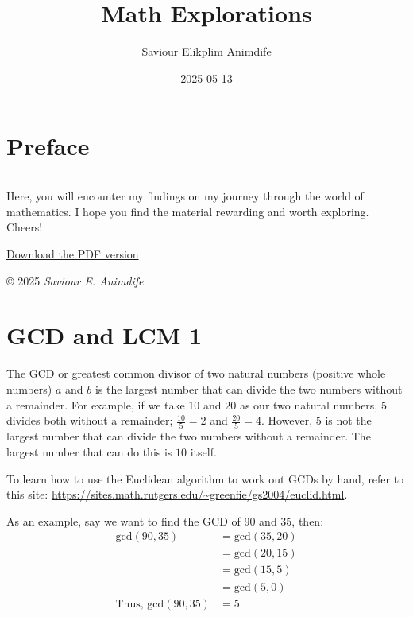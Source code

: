 \documentclass[
]{book}
\title{Math Explorations}
\author{Saviour Elikplim Animdife}
\date{2025-05-13}
\begin{document}
\maketitle

{
\setcounter{tocdepth}{1}
\tableofcontents
}
\chapter*{Preface}\label{preface}

\begin{center}\rule{0.5\linewidth}{0.5pt}\end{center}

Here, you will encounter my findings on my journey through the world of mathematics. I hope you find the material rewarding and worth exploring. Cheers!

\href{https://github.com/sneurocode/math-explorations/blob/master/docs/_main.pdf}{Download the PDF version}

© 2025 \emph{Saviour E. Animdife}

\chapter{GCD and LCM 1}\label{gcd-and-lcm-1}

The GCD or greatest common divisor of two natural numbers (positive whole numbers) \(a\) and \(b\) is the largest number that can divide the two numbers without a remainder. For example, if we take \(10\) and \(20\) as our two natural numbers, \(5\) divides both without a remainder; \(\frac{10}{5} = 2\) and \(\frac{20}{5} = 4\). However, \(5\) is not the largest number that can divide the two numbers without a remainder. The largest number that can do this is \(10\) itself.

To learn how to use the Euclidean algorithm to work out GCDs by hand, refer to this site: \url{https://sites.math.rutgers.edu/~greenfie/gs2004/euclid.html}.

As an example, say we want to find the GCD of 90 and 35, then:
\[
\begin{aligned}
\text{gcd}(90, 35) &= \text{gcd}(35, 20) \\
&= \text{gcd}(20, 15) \\
&= \text{gcd}(15, 5) \\
&= \text{gcd}(5, 0) \\
\text{Thus, gcd}(90, 35) &= 5
\end{aligned}
\]
\end{document}
